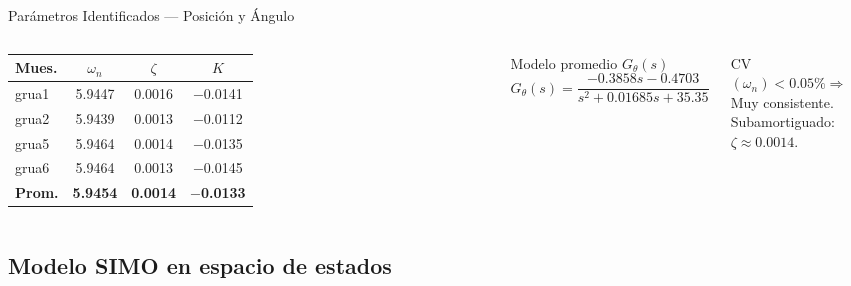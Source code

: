 \documentclass[mathserif,spanish,10pt]{beamer}
\begin{document}
\begin{frame}{Parámetros Identificados — Posición y Ángulo}
\begin{columns}[T]
  \begin{table}
    \centering
    \scriptsize
    \begin{tabular}{lccc}
      \hline
      \rowcolor{rowhdr}
      \color{white}\textbf{Mues.} &
      \color{white}$\omega_n$ &
      \color{white}$\zeta$ &
      \color{white}$K$ \\
      \hline
      grua1 & 5.9447 & 0.0016 & $-$0.0141 \\
      grua2 & 5.9439 & 0.0013 & $-$0.0112 \\
      grua5 & 5.9464 & 0.0014 & $-$0.0135 \\
      grua6 & 5.9464 & 0.0013 & $-$0.0145 \\
      \rowcolor{accentteal!20}
      \textbf{Prom.} & \textbf{5.9454} & \textbf{0.0014} & \textbf{$-$0.0133} \\
      \hline
    \end{tabular}
  \end{table}

  \vspace{-2pt}
  \begin{block}{Modelo promedio $G_\theta(s)$}
    \centering\scriptsize
    \[
      G_\theta(s) = \frac{-0.3858s - 0.4703}{s^2 + 0.01685s + 35.35}
    \]
  \end{block}

  \vspace{-2pt}
  {\centering\fontsize{7pt}{8pt}\selectfont
  CV$(\omega_n)<0.05\% \Rightarrow$ Muy consistente.\\
  Subamortiguado: $\zeta\approx0.0014$.\par}

\end{columns}
\end{frame}
\subsection{Modelo SIMO en espacio de estados}
\end{document}
